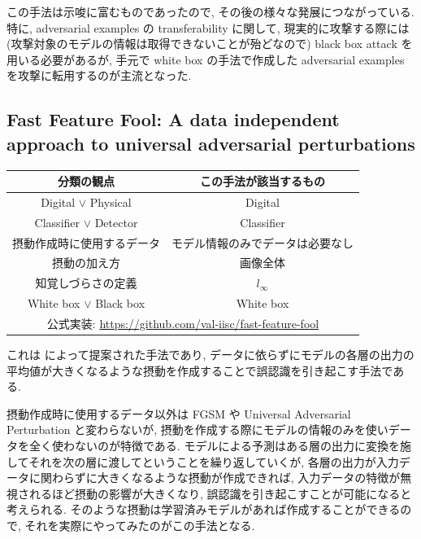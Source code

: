 この手法は示唆に富むものであったので, その後の様々な発展につながっている.
特に, adversarial examples の transferability に関して, 現実的に攻撃する際には (攻撃対象のモデルの情報は取得できないことが殆どなので)  black box attack を用いる必要があるが, 手元で white box の手法で作成した adversarial examples を攻撃に転用するのが主流となった.



\subsection{Fast Feature Fool: A data independent approach to universal adversarial perturbations}
\label{subsec:fast-feature}
%
\begin{table}[htbp]
\begin{center}
\begin{tabular}{|c|c|}
\hline
分類の観点 & この手法が該当するもの \\
\hline
Digital $\lor$ Physical & Digital \\
Classifier $\lor$ Detector & Classifier \\
摂動作成時に使用するデータ & モデル情報のみでデータは必要なし \\
摂動の加え方 & 画像全体 \\
知覚しづらさの定義 & $l_{\infty}$ \\
White box $\lor$ Black box & White box \\
\hline
\multicolumn{2}{|c|}{公式実装: \href{https://github.com/val-iisc/fast-feature-fool}{https://github.com/val-iisc/fast-feature-fool}} \\
\hline
\end{tabular}
\label{tb:fast-feature-summary}
\end{center}
\end{table}
%

これは \cite{mopuri2017fast} によって提案された手法であり, データに依らずにモデルの各層の出力の平均値が大きくなるような摂動を作成することで誤認識を引き起こす手法である.

摂動作成時に使用するデータ以外は FGSM や Universal Adversarial Perturbation と変わらないが, 摂動を作成する際にモデルの情報のみを使いデータを全く使わないのが特徴である.
モデルによる予測はある層の出力に変換を施してそれを次の層に渡してということを繰り返していくが, 各層の出力が入力データに関わらずに大きくなるような摂動が作成できれば, 入力データの特徴が無視されるほど摂動の影響が大きくなり, 誤認識を引き起こすことが可能になると考えられる.
そのような摂動は学習済みモデルがあれば作成することができるので, それを実際にやってみたのがこの手法となる.

